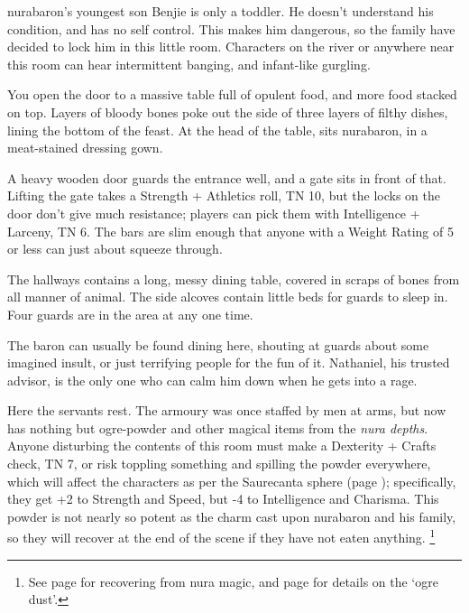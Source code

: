 \begin{multicols}{2}

\Gls{nurabaron}'s youngest son Benjie is only a toddler.
He doesn't understand his condition, and has no self control.
This makes him dangerous, so the family have decided to lock him in this little room.
Characters on the river or anywhere near this room can hear intermittent banging, and infant-like gurgling.



\begin{boxtext}

	You open the door to a massive table full of opulent food, and more food stacked on top.  Layers of bloody bones poke out the side of three layers of filthy dishes, lining the bottom of the feast.  At the head of the table, sits \gls{nurabaron}, in a meat-stained dressing gown.

\end{boxtext}

A heavy wooden door guards the entrance well, and a gate sits in front of that.  Lifting the gate takes a Strength + Athletics roll, TN 10, but the locks on the door don't give much resistance; players can pick them with Intelligence + Larceny, TN 6.  The bars are slim enough that anyone with a Weight Rating of 5 or less can just about squeeze through.

The hallways contains a long, messy dining table, covered in scraps of bones from all manner of animal.  The side alcoves contain little beds for guards to sleep in.  Four guards are in the area at any one time.

The baron can usually be found dining here, shouting at guards about some imagined insult, or just terrifying people for the fun of it.  Nathaniel, his trusted advisor, is the only one who can calm him down when he gets into a rage.

\nurabaron


Here the servants rest.
The armoury was once staffed by men at arms, but now has nothing but ogre-powder and other magical items from the \textit{nura depths}.
Anyone disturbing the contents of this room must make a Dexterity + Crafts check, TN 7, or risk toppling something and spilling the powder everywhere, which will affect the characters as per the Saurecanta sphere (page \pageref{saurecanta}); specifically, they get +2 to Strength and Speed, but -4 to Intelligence and Charisma.
This powder is not nearly so potent as the charm cast upon \gls{nurabaron} and his family, so they will recover at the end of the scene if they have not eaten anything.
\footnote{See page \pageref{nura_recovery} for recovering from nura magic, and page \pageref{ogredust} for details on the `ogre dust'.}


\end{multicols}
